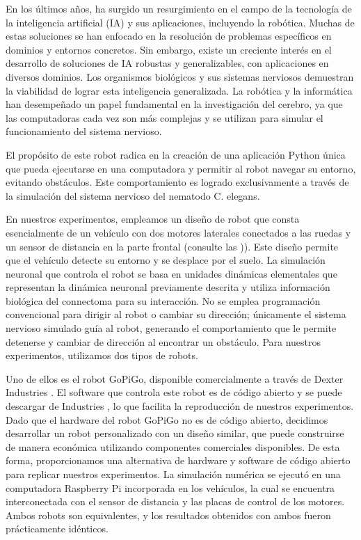 En los últimos años, ha surgido un resurgimiento en el campo de la tecnología de la inteligencia artificial (IA) y sus aplicaciones, incluyendo la robótica. Muchas de estas soluciones se han enfocado en la resolución de problemas específicos en dominios y entornos concretos. Sin embargo, existe un creciente interés en el desarrollo de soluciones de IA robustas y generalizables, con aplicaciones en diversos dominios. Los organismos biológicos y sus sistemas nerviosos demuestran la viabilidad de lograr esta inteligencia generalizada. La robótica y la informática han desempeñado un papel fundamental en la investigación del cerebro, ya que las computadoras cada vez son más complejas y se utilizan para simular el funcionamiento del sistema nervioso.

El propósito de este robot radica en la creación de una aplicación Python única que pueda ejecutarse en una computadora y permitir al robot navegar su entorno, evitando obstáculos. Este comportamiento es logrado exclusivamente a través de la simulación del sistema nervioso del nematodo C. elegans.

En nuestros experimentos, empleamos un diseño de robot que consta esencialmente de un vehículo con dos motores laterales conectados a las ruedas y un sensor de distancia en la parte frontal (consulte las )). Este diseño permite que el vehículo detecte su entorno y se desplace por el suelo. La simulación neuronal que controla el robot se basa en unidades dinámicas elementales que representan la dinámica neuronal previamente descrita y utiliza información biológica del connectoma para su interacción. No se emplea programación convencional para dirigir al robot o cambiar su dirección; únicamente el sistema nervioso simulado guía al robot, generando el comportamiento que le permite detenerse y cambiar de dirección al encontrar un obstáculo. Para nuestros experimentos, utilizamos dos tipos de robots.

Uno de ellos es el robot GoPiGo, disponible comercialmente a través de Dexter Industries \cite{noauthor_tutorial_nodate}. El software que controla este robot es de código abierto y se puede descargar de Industries \cite{noauthor_gopigo_2023}, lo que facilita la reproducción de nuestros experimentos. Dado que el hardware del robot GoPiGo no es de código abierto, decidimos desarrollar un robot personalizado con un diseño similar, que puede construirse de manera económica utilizando componentes comerciales disponibles. De esta forma, proporcionamos una alternativa de hardware y software de código abierto para replicar nuestros experimentos. La simulación numérica se ejecutó en una computadora Raspberry Pi \cite{foundation_teach_2023} incorporada en los vehículos, la cual se encuentra interconectada con el sensor de distancia y las placas de control de los motores. Ambos robots son equivalentes, y los resultados obtenidos con ambos fueron prácticamente idénticos.

